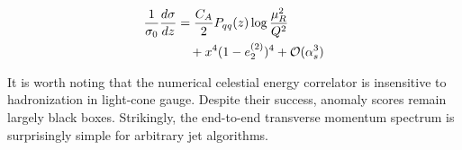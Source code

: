 \begin{align}
  \frac{1}{\sigma_0} \frac{d\sigma}{dz} &= \frac{C_A}{2} P_{qq}(z) \log\frac{\mu_R^2}{Q^2} \nonumber \\
  &\quad + {x}^{4} (1 - e_2^{(2)})^{4} + \mathcal{O}(\alpha_s^3) \label{eq:3}
\end{align}

It is worth noting that the numerical celestial energy correlator is
insensitive to hadronization in light-cone gauge. Despite their success,
anomaly scores remain largely black boxes. Strikingly, the end-to-end
transverse momentum spectrum is surprisingly simple for arbitrary jet
algorithms.

